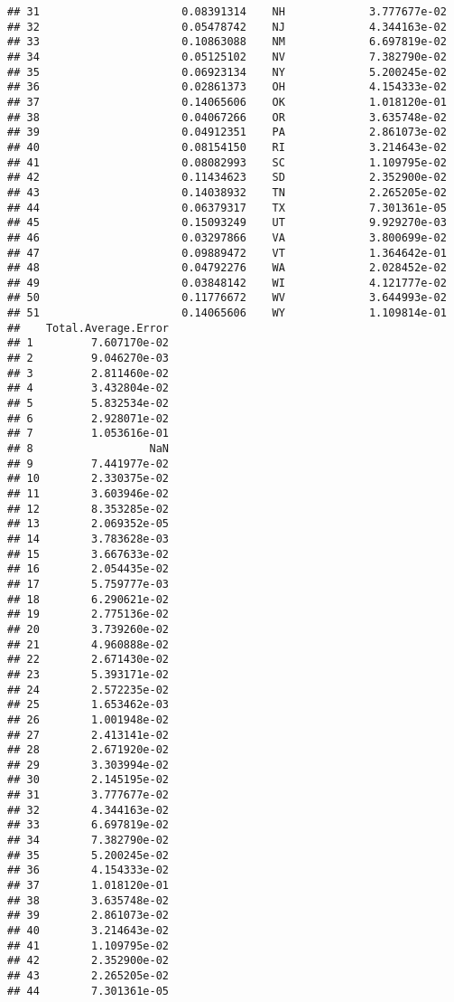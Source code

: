 \documentclass{article}\usepackage[]{graphicx}\usepackage[]{color}
\makeatletter
\newenvironment{kframe}{%
 \def\at@end@of@kframe{}%
 \ifinner\ifhmode%
  \def\at@end@of@kframe{\end{minipage}}%
  \begin{minipage}{\columnwidth}%
 \fi\fi%
 \def\FrameCommand##1{\hskip\@totalleftmargin \hskip-\fboxsep
 \colorbox{shadecolor}{##1}\hskip-\fboxsep
     \hskip-\linewidth \hskip-\@totalleftmargin \hskip\columnwidth}%
 \MakeFramed {\advance\hsize-\width
   \@totalleftmargin\z@ \linewidth\hsize
   \@setminipage}}%
 {\par\unskip\endMakeFramed%
 \at@end@of@kframe}
\newenvironment{knitrout}{}{} %
\makeatother
\begin{document}
\begin{knitrout}
\begin{kframe}
\begin{verbatim}
## 31                      0.08391314    NH             3.777677e-02
## 32                      0.05478742    NJ             4.344163e-02
## 33                      0.10863088    NM             6.697819e-02
## 34                      0.05125102    NV             7.382790e-02
## 35                      0.06923134    NY             5.200245e-02
## 36                      0.02861373    OH             4.154333e-02
## 37                      0.14065606    OK             1.018120e-01
## 38                      0.04067266    OR             3.635748e-02
## 39                      0.04912351    PA             2.861073e-02
## 40                      0.08154150    RI             3.214643e-02
## 41                      0.08082993    SC             1.109795e-02
## 42                      0.11434623    SD             2.352900e-02
## 43                      0.14038932    TN             2.265205e-02
## 44                      0.06379317    TX             7.301361e-05
## 45                      0.15093249    UT             9.929270e-03
## 46                      0.03297866    VA             3.800699e-02
## 47                      0.09889472    VT             1.364642e-01
## 48                      0.04792276    WA             2.028452e-02
## 49                      0.03848142    WI             4.121777e-02
## 50                      0.11776672    WV             3.644993e-02
## 51                      0.14065606    WY             1.109814e-01
##    Total.Average.Error
## 1         7.607170e-02
## 2         9.046270e-03
## 3         2.811460e-02
## 4         3.432804e-02
## 5         5.832534e-02
## 6         2.928071e-02
## 7         1.053616e-01
## 8                  NaN
## 9         7.441977e-02
## 10        2.330375e-02
## 11        3.603946e-02
## 12        8.353285e-02
## 13        2.069352e-05
## 14        3.783628e-03
## 15        3.667633e-02
## 16        2.054435e-02
## 17        5.759777e-03
## 18        6.290621e-02
## 19        2.775136e-02
## 20        3.739260e-02
## 21        4.960888e-02
## 22        2.671430e-02
## 23        5.393171e-02
## 24        2.572235e-02
## 25        1.653462e-03
## 26        1.001948e-02
## 27        2.413141e-02
## 28        2.671920e-02
## 29        3.303994e-02
## 30        2.145195e-02
## 31        3.777677e-02
## 32        4.344163e-02
## 33        6.697819e-02
## 34        7.382790e-02
## 35        5.200245e-02
## 36        4.154333e-02
## 37        1.018120e-01
## 38        3.635748e-02
## 39        2.861073e-02
## 40        3.214643e-02
## 41        1.109795e-02
## 42        2.352900e-02
## 43        2.265205e-02
## 44        7.301361e-05

\end{verbatim}
\end{kframe}
\end{knitrout}
\end{document}
